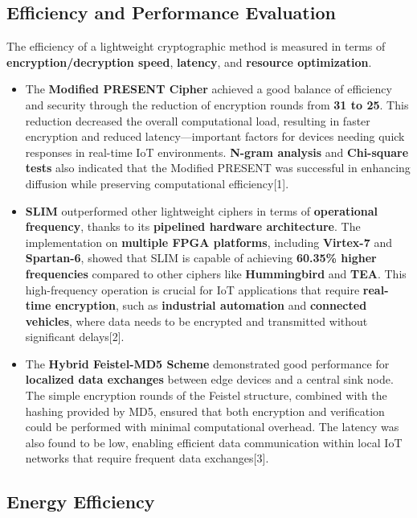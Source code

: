 \documentclass{article}
\begin{document}
\subsection{Efficiency and Performance Evaluation}

The efficiency of a lightweight cryptographic method is measured in terms of \textbf{encryption/decryption speed}, \textbf{latency}, and \textbf{resource optimization}.

\begin{itemize}
    \item The \textbf{Modified PRESENT Cipher} achieved a good balance of efficiency and security through the reduction of encryption rounds from \textbf{31 to 25}. This reduction decreased the overall computational load, resulting in faster encryption and reduced latency—important factors for devices needing quick responses in real-time IoT environments. \textbf{N-gram analysis} and \textbf{Chi-square tests} also indicated that the Modified PRESENT was successful in enhancing diffusion while preserving computational efficiency[1].
    \item \textbf{SLIM} outperformed other lightweight ciphers in terms of \textbf{operational frequency}, thanks to its \textbf{pipelined hardware architecture}. The implementation on \textbf{multiple FPGA platforms}, including \textbf{Virtex-7} and \textbf{Spartan-6}, showed that SLIM is capable of achieving \textbf{60.35\% higher frequencies} compared to other ciphers like \textbf{Hummingbird} and \textbf{TEA}. This high-frequency operation is crucial for IoT applications that require \textbf{real-time encryption}, such as \textbf{industrial automation} and \textbf{connected vehicles}, where data needs to be encrypted and transmitted without significant delays[2].
    \item The \textbf{Hybrid Feistel-MD5 Scheme} demonstrated good performance for \textbf{localized data exchanges} between edge devices and a central sink node. The simple encryption rounds of the Feistel structure, combined with the hashing provided by MD5, ensured that both encryption and verification could be performed with minimal computational overhead. The latency was also found to be low, enabling efficient data communication within local IoT networks that require frequent data exchanges[3].
\end{itemize}

\subsection{Energy Efficiency}
\end{document}
